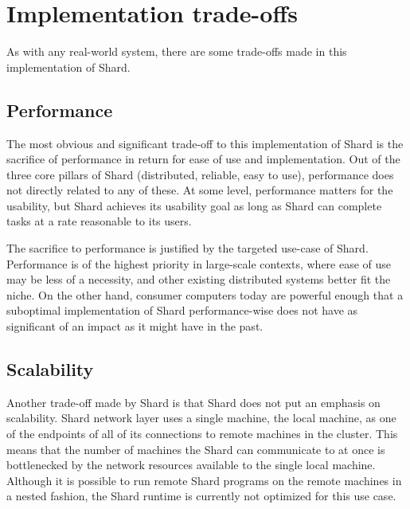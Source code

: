 \documentclass[oneside]{report}
\newcommand{\todoi}[1]{\todo[inline, color=blue!20]{TODO: {#1}}}
\begin{document}
\section{Implementation trade-offs}

As with any real-world system, there are some trade-offs made in this implementation of Shard.

\subsection{Performance}

The most obvious and significant trade-off to this implementation of Shard is the sacrifice of performance in return for ease of use and implementation.
Out of the three core pillars of Shard (distributed, reliable, easy to use), performance does not directly related to any of these.
At some level, performance matters for the usability, but Shard achieves its usability goal as long as Shard can complete tasks at a rate reasonable to its users.

The sacrifice to performance is justified by the targeted use-case of Shard.
Performance is of the highest priority in large-scale contexts, where ease of use may be less of a necessity, and other existing distributed systems better fit the niche.
On the other hand, consumer computers today are powerful enough that a suboptimal implementation of Shard performance-wise does not have as significant of an impact as it might have in the past.

\subsection{Scalability}
Another trade-off made by Shard is that Shard does not put an emphasis on scalability.
Shard network layer uses a single machine, the local machine, as one of the endpoints of all of its connections to remote machines in the cluster.
This means that the number of machines the Shard can communicate to at once is bottlenecked by the network resources available to the single local machine.
Although it is possible to run remote Shard programs on the remote machines in a nested fashion, the Shard runtime is currently not optimized for this use case.
\end{document}

